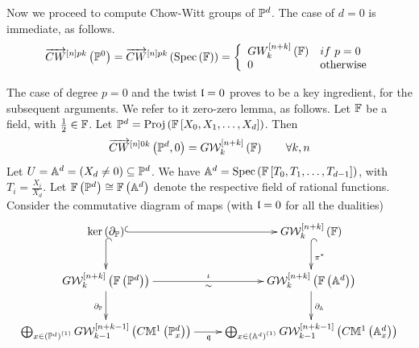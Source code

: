 \documentclass[12pt]{article}
\begin{document}
%  
 

 \vspace{3mm}
Now we proceed to compute Chow-Witt groups of ${\BP}^d$. 
The case of $d=0$ is immediate, as follows.
\begin{equation}\label{disze0case}
\ora{CW}^{\LRt{n}pk}\LRf{{\BP}^0}= \ora{CW}^{\LRt{n}pk}\LRf{\spec{{\BF}}}=
 \LBrace{{ll}
 GW^{\LRt{n+k}}_k\LRf{{\BF}} & if ~p=0\\
 0 & {\rm otherwise}\\
 }
\end{equation}

\vspace{3mm}
The case of degree $p=0$ and the twist $\l=0$ proves to be a key ingredient, for the subsequent 
arguments. We refer to it zero-zero lemma, as follows. 
\label{degreeZero}{\rm 
Let ${\BF}$ be a field, with $\frac{1}{2}\in {\BF}$. Let ${\BP}^d=\proj{{\BF}\LRt{X_0, X_1, \ldots, X_d}}$. 
Then 
$$
\ora{CW}^{\LRt{n}0k}\LRf{{\BP}^d, 0} = G{\CW}^{\LRt{n+k}}_k\LRf{{\BF}} \qquad \forall k, n
$$ 
}
\eL
\pf %
Let  $U={\BA}^d=(X_d\neq 0)\subseteq {\BP}^d$.  We have 
${\BA}^d=\spec{{\BF}\LRt{T_0, T_1, \ldots, T_{d-1}}}$, with $T_i=\frac{X_i}{X_d}$. 
Let ${\BF}\LRf{{\BP}^d}\cong {\BF}\LRf{{\BA}^d}$ denote the respective field of rational functions. 
Consider the commutative diagram of maps (with $\l=0$ for all the dualities)
 \begin{equation}\label{resketch4P1}
  \diagram 
\ker\LRf{\partial_{{\BP}}}\ar@{^(->}[d] \ar@{^(->}[r] &G{\CW}_k^{\LRt{n+k}}\LRf{{\BF}}\ar@{^(->}[d]^{\pi^*}\\
  G{\CW}_k^{\LRt{n+k}}\LRf{{\BF}\LRf{{\BP}^d}} \ar[r]^{\iota}_{\sim} \ar[d]_{\partial_{{\BP}}}& G{\CW}_k^{\LRt{n+k}}\LRf{{\BF}\LRf{{\BA}^d}}\ar[d]^{\partial_{{\BA}}} \\
 \bigoplus_{x\in \LRf{{\BP}^d}^{\LRf{1}}}   G{\CW}_{k-1}^{\LRt{n+k-1}}\LRf{C{\BM}^1\LRf{{\BP}^d_x}} \ar[r]_{\q} & 
  \bigoplus_{x\in \LRf{{\BA}^d}^{\LRf{1}}} G{\CW}_{k-1}^{\LRt{n+k-1}}\LRf{C{\BM}^1\LRf{{\BA}^d_x}} \\
  \enddiagram
  \end{equation}
\end{document}
